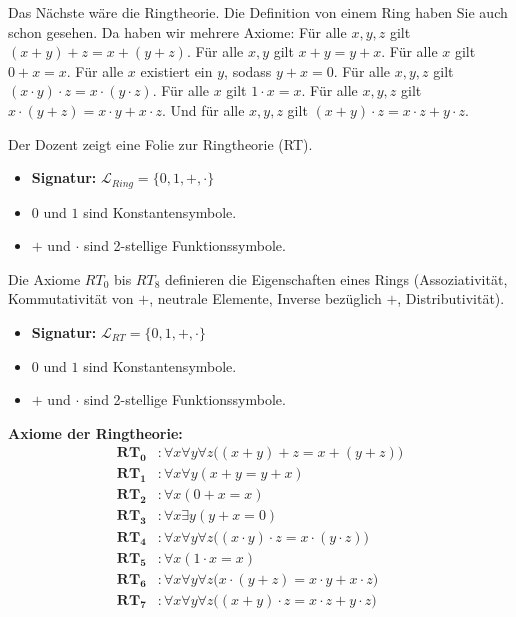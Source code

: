 \begin{spoken-clean}[01:25:47 - 01:29:17]
Das Nächste wäre die Ringtheorie. Die Definition von einem Ring haben Sie auch schon gesehen. Da haben wir mehrere Axiome: Für alle $x, y, z$ gilt $(x + y) + z = x + (y + z)$. Für alle $x, y$ gilt $x + y = y + x$. Für alle $x$ gilt $0 + x = x$. Für alle $x$ existiert ein $y$, sodass $y + x = 0$. Für alle $x, y, z$ gilt $(x \cdot y) \cdot z = x \cdot (y \cdot z)$. Für alle $x$ gilt $1 \cdot x = x$. Für alle $x, y, z$ gilt $x \cdot (y + z) = x \cdot y + x \cdot z$. Und für alle $x, y, z$ gilt $(x + y) \cdot z = x \cdot z + y \cdot z$.
\end{spoken-clean}

\begin{meta-note}
Der Dozent zeigt eine Folie zur Ringtheorie (RT).
\begin{itemize}
    \item \textbf{Signatur:} $\mathcal{L}_{Ring} = \{0, 1, +, \cdot\}$
    \item $0$ und $1$ sind Konstantensymbole.
    \item $+$ und $\cdot$ sind 2-stellige Funktionssymbole.
\end{itemize}
Die Axiome $RT_0$ bis $RT_8$ definieren die Eigenschaften eines Rings (Assoziativität, Kommutativität von $+$, neutrale Elemente, Inverse bezüglich $+$, Distributivität).
\end{meta-note}

\begin{math-stroke}
\begin{itemize}
    \item \textbf{Signatur:} $\mathcal{L}_{RT} = \{0, 1, +, \cdot\}$
    \item $0$ und $1$ sind Konstantensymbole.
    \item $+$ und $\cdot$ sind 2-stellige Funktionssymbole.
\end{itemize}

\textbf{Axiome der Ringtheorie:}
\begin{align*}
    \mathbf{RT_0} &\colon \forall x \forall y \forall z \bigl((x + y) + z = x + (y + z)\bigr) \\
    \mathbf{RT_1} &\colon \forall x \forall y (x + y = y + x) \\
    \mathbf{RT_2} &\colon \forall x (0 + x = x) \\
    \mathbf{RT_3} &\colon \forall x \exists y (y + x = 0) \\
    \mathbf{RT_4} &\colon \forall x \forall y \forall z \bigl((x \cdot y) \cdot z = x \cdot (y \cdot z)\bigr) \\
    \mathbf{RT_5} &\colon \forall x (1 \cdot x = x) \\
    \mathbf{RT_6} &\colon \forall x \forall y \forall z \bigl(x \cdot (y + z) = x \cdot y + x \cdot z\bigr) \\
    \mathbf{RT_7} &\colon \forall x \forall y \forall z \bigl((x + y) \cdot z = x \cdot z + y \cdot z\bigr)
\end{align*}
\end{math-stroke}

